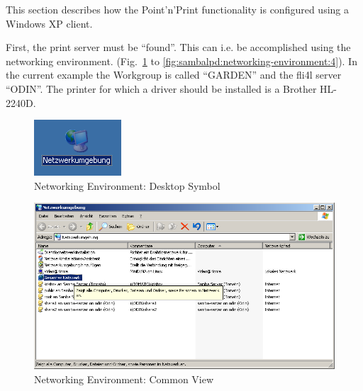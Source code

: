 

This section describes how the Point'n'Print functionality is configured
using a Windows XP client.

First, the print server must be ``found''. This can i.e. be accomplished
using the networking environment.
(Fig.~\ref{fig:sambalpd:icon-networking-environment} to
\ref{fig:sambalpd:networking-environment:4}). In the current example the
Workgroup is called ``GARDEN'' and the fli4l server ``ODIN''. The printer
for which a driver should be installed is a Brother HL-2240D.

\begin{figure}[hbt!]
\centering
\includegraphics[]{image001}
\caption{Networking Environment: Desktop Symbol}
\label{fig:sambalpd:icon-networking-environment}
\end{figure}

\begin{figure}[hbt!]
\centering
\includegraphics[width=\columnwidth]{image002}
\caption{Networking Environment: Common View}
\label{fig:sambalpd:networking-environment:1}
\end{figure}

